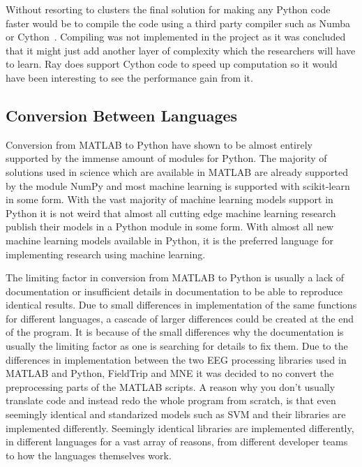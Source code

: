 \documentclass[12pt, a4paper]{article}
\begin{document}
Without resorting to clusters the final solution for making any Python code faster would be to compile the code using a third party compiler such as Numba or Cython~\cite{matEval}.
Compiling was not implemented in the project as it was concluded that it might just add another layer of complexity which the researchers will have to learn.
Ray does support Cython code to speed up computation so it would have been interesting to see the performance gain from it.





\subsection{Conversion Between Languages}

Conversion from MATLAB to Python have shown to be almost entirely supported by the immense amount of modules for Python.
The majority of solutions used in science which are available in MATLAB are already supported by the module NumPy and most machine learning is supported with scikit-learn in some form.
With the vast majority of machine learning models support in Python it is not weird that almost all cutting edge machine learning research publish their models in a Python module in some form.
With almost all new machine learning models available in Python, it is the preferred language for implementing research using machine learning.

The limiting factor in conversion from MATLAB to Python is usually a lack of documentation or insufficient details in documentation to be able to reproduce identical results.
Due to small differences in implementation of the same functions for different languages, a cascade of larger differences could be created at the end of the program.
It is because of the small differences why the documentation is usually the limiting factor as one is searching for details to fix them.
Due to the differences in implementation between the two EEG processing libraries used in MATLAB and Python, FieldTrip and MNE it was decided to no convert the preprocessing parts of the MATLAB scripts.
A reason why you don't usually translate code and instead redo the whole program from scratch, is that even seemingly identical and standarized models such as SVM and their libraries are implemented differently.
Seemingly identical libraries are implemented differently, in different languages for a vast array of reasons, from different developer teams to how the languages themselves work.
\end{document}
